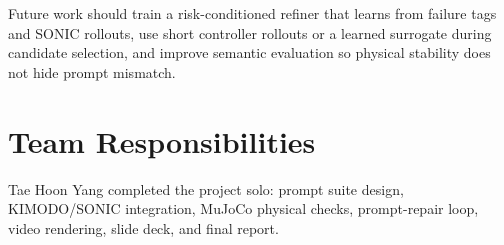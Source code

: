 \documentclass[10pt]{article}
\begin{document}
Future work should train a risk-conditioned refiner that learns from failure
tags and SONIC rollouts, use short controller rollouts or a learned surrogate
during candidate selection, and improve semantic evaluation so physical
stability does not hide prompt mismatch.

\section{Team Responsibilities}

Tae Hoon Yang completed the project solo: prompt suite design, KIMODO/SONIC
integration, MuJoCo physical checks, prompt-repair loop, video rendering, slide
deck, and final report.



\end{document}
